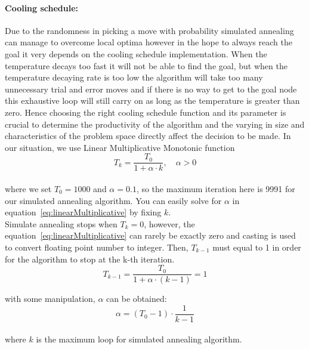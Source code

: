 \documentclass[a4paper]{article}
\begin{document}
\paragraph{Cooling schedule:} Due to the randomness in picking a move with probability simulated annealing can manage to overcome local optima however in the hope to always reach the goal it very depends on the cooling schedule implementation. When the temperature decays too fast it will not be able to find the goal, but when the temperature decaying rate is too low the algorithm will take too many unnecessary trial and error moves and if there is no way to get to the goal node this exhaustive loop will still carry on as long as the temperature is greater than zero. Hence choosing the right cooling schedule function and its parameter is crucial to determine the productivity of the algorithm and the varying in size and characteristics of the problem space directly affect the decision to be made. In our situation, we use Linear Multiplicative Monotonic function \\

\begin{equation} \label{eq:linearMultiplicative}
T_k = \frac{T_0}{1 + \alpha \cdot k}, \quad \alpha > 0
\end{equation}
\\
where we set $T_0 = 1000$ and $\alpha = 0.1$, so the maximum iteration here is 9991 for our simulated annealing algorithm. You can easily solve for $\alpha$ in equation~\ref{eq:linearMultiplicative} by fixing $k$. \\ %

Simulate annealing stops when $T_k = 0$, however, the equation~\ref{eq:linearMultiplicative} can rarely be exactly zero and casting is used to convert floating point number to integer. Then, $T_{k-1}$ must equal to 1 in order for the algorithm to stop at the k-th iteration. \\

\begin{equation}
	T_{k-1} = \frac{T_0}{1 + \alpha \cdot (k - 1)} = 1
\end{equation}

with some manipulation, $\alpha$ can be obtained: \\

\begin{equation}
\alpha = \left(T_0-1\right) \cdot \frac{1}{k-1}
\end{equation}
\\
where $k$ is the maximum loop for simulated annealing algorithm. \\
\end{document}
